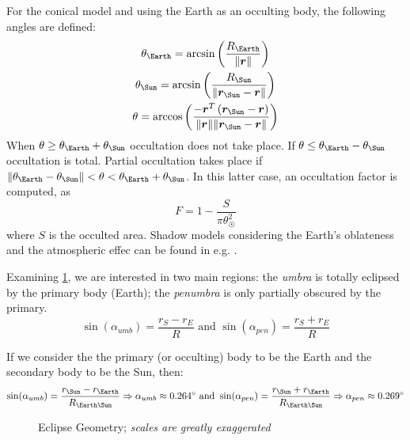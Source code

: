 For the conical model and using the Earth as an occulting body, the following 
angles are defined:
\begin{gather}
  \theta _{\Earth} = \arcsin \left( \frac{R_{\Earth}}{\norm{\bm{r}}} \right) \\
  \theta _{\Sun}   = \arcsin \left( \frac{R_{\Sun}}{\norm{\bm{r}_{\Sun} - \bm{r}}} \right) \\
  \theta           = \arccos \left( \frac{-\bm{r}^{T} \left( \bm{r}_{\Sun} - \bm{r}\right)}{\norm{\bm{r}}\norm{\bm{r}_{\Sun} - \bm{r}}} \right)
\end{gather}
When $\theta \ge \theta _{\Earth} + \theta _{\Sun}$ occultation does not take place. 
If $\theta \le \theta _{\Earth} - \theta _{\Sun}$ occultation is total. Partial 
occultation takes place if 
$\norm{\theta _{\Earth} - \theta _{\Sun}} < \theta < \theta _{\Earth} + \theta _{\Sun}$. 
In this latter case, an occultation factor is computed, as
\begin{equation}
  F = 1 - \frac{S}{\pi \theta _{\Sun} ^2}
\end{equation}
where $S$ is the occulted area. Shadow models considering the Earth's oblateness 
and the atmospheric effec can be found in e.g. \cite{Zhang2022}.



\iffalse
Examining \ref{fig:eclipse-geometry}, we are interested in two main regions: the 
\emph{umbra} is totally eclipsed by the primary body (Earth); the \emph{penumbra} 
is only partially obscured by the primary.
\begin{equation}
    \sin({\alpha}_{umb}) = \frac{r_S - r_E}{R} \text{ and }
    \sin({\alpha}_{pen}) = \frac{r_S + r_E}{R}
\end{equation}

If we consider the the primary (or occulting) body to be the Earth and the 
secondary body to be the Sun, then:
\begin{equation}
    \sin({\alpha}_{umb}) = \frac{r_{\Sun} - r_{\Earth}}{R_{\Earth\Sun}} 
    \Rightarrow {\alpha}_{umb} \approx \SI{0.264}{\degree}
    \text{ and }
    \sin({\alpha}_{pen}) = \frac{r_{\Sun} + r_{\Earth}}{R_{\Earth\Sun}}
    \Rightarrow {\alpha}_{pen} \approx \SI{0.269}{\degree}
\end{equation}

\begin{figure}
\centering

\caption{Eclipse Geometry; \emph{scales are greatly exaggerated}}
\label{fig:eclipse-geometry}
\end{figure}

